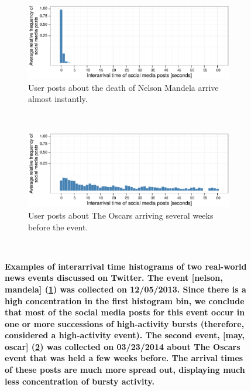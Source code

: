 \documentclass[10pt,letterpaper]{article}
\begin{document}
\begin{figure}
  \centering
  \begin{subfigure}{\textwidth}
    \includegraphics[width=\textwidth]{figures/plots_revision/fig1a}
    \caption{User posts about the death of Nelson Mandela arrive
      almost instantly.}
    \label{fig:fig1a}
  \end{subfigure}%

  ~ %
  \begin{subfigure}{\textwidth}
   \includegraphics[width=\textwidth]{figures/plots_revision/fig1b}
    \caption{User posts about The Oscars arriving several weeks before
      the event.}
    \label{fig:fig1b}
  \end{subfigure}%
  ~ %

  \caption{\textbf{Examples of interarrival time histograms of two real-world news
events discussed on Twitter. The event [nelson, mandela] (\ref{fig:fig1a}) was
      collected on 12/05/2013. Since there is a high
      concentration in the first histogram bin, we conclude that most of the social media posts
      for this event occur in one or more successions of high-activity
      bursts (therefore, considered a high-activity event).
      The second event, [may, oscar] (\ref{fig:fig1b}) was collected
      on 03/23/2014 about The Oscars event that was held a few
      weeks before. The arrival times of these posts are much more spread
      out, displaying much less concentration of bursty activity.} 
  }
  \label{fig:fig1}
\end{figure}
\end{document}

